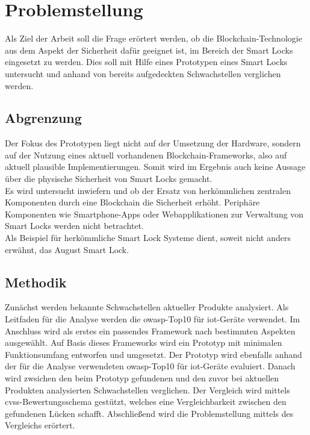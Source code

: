 \section{Problemstellung}
\label{sec:problem}
    Als Ziel der Arbeit soll die Frage erörtert werden, ob die Block\-chain\--Tech\-no\-lo\-gie aus dem Aspekt der Sicherheit dafür geeignet ist, im Bereich der Smart Locks eingesetzt zu werden.
    Dies soll mit Hilfe eines Prototypen eines Smart Locks untersucht und anhand von bereits aufgedeckten Schwachstellen verglichen werden.
    
    \subsection{Abgrenzung}
    \label{sec:problem_limit}
		Der Fokus des Prototypen liegt nicht auf der Umsetzung der Hardware, sondern auf der Nutzung eines aktuell vorhandenen Blockchain-Frameworks, also auf aktuell plausible Implementierungen.
		Somit wird im Ergebnis auch keine Aussage über die physische Sicherheit von Smart Locks gemacht.
		\medskip\\
		Es wird untersucht inwiefern und ob der Ersatz von herkömmlichen zentralen Komponenten durch eine Blockchain die Sicherheit erhöht. 
		Periphäre Komponenten wie Smartphone-Apps oder Webapplikationen zur Verwaltung von Smart Locks werden nicht betrachtet.
		\medskip\\
		Als Beispiel für herkömmliche Smart Lock Systeme dient, soweit nicht anders erwähnt, das August Smart Lock.

    \subsection{Methodik}
    \label{sec:problem_methods}
        Zunächst werden bekannte Schwachstellen aktueller Produkte analysiert.
        Als Leitfaden für die Analyse werden die \gls{owasp}-Top10 für  \gls{iot}-Geräte\cite{Miessler2015a} verwendet.
        Im Anschluss wird als erstes ein passendes Framework nach bestimmten Aspekten ausgewählt.
        Auf Basis dieses Frameworks wird ein Prototyp mit minimalen Funktionsumfang entworfen und umgesetzt.
        Der Prototyp wird ebenfalls anhand der für die Analyse verwendeten \gls{owasp}-Top10 für \gls{iot}-Geräte evaluiert.
        Danach wird zwsichen den beim Prototyp gefundenen und den zuvor bei aktuellen Produkten analysierten Schwachstellen verglichen.
        Der Vergleich wird mittels \gls{cvss}-Bewertungsschema gestützt, welches eine Vergleichbarkeit zwischen den gefundenen Lücken schafft.
        Abschließend wird die Problemstellung mittels des Vergleichs erörtert.
    
